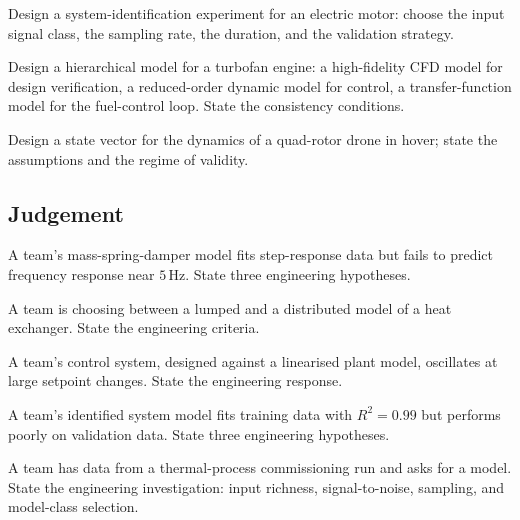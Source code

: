 \begin{exercise}
Design a system-identification experiment for an electric motor: choose the input signal class, the sampling rate, the duration, and the validation strategy.
\end{exercise}

\begin{exercise}
Design a hierarchical model for a turbofan engine: a high-fidelity CFD model for design verification, a reduced-order dynamic model for control, a transfer-function model for the fuel-control loop. State the consistency conditions.
\end{exercise}

\begin{exercise}
Design a state vector for the dynamics of a quad-rotor drone in hover; state the assumptions and the regime of validity.
\end{exercise}

\subsection*{Judgement}

\begin{exercise}
A team's mass-spring-damper model fits step-response data but fails to predict frequency response near $5\,\text{Hz}$. State three engineering hypotheses.
\end{exercise}

\begin{exercise}
A team is choosing between a lumped and a distributed model of a heat exchanger. State the engineering criteria.
\end{exercise}

\begin{exercise}
A team's control system, designed against a linearised plant model, oscillates at large setpoint changes. State the engineering response.
\end{exercise}

\begin{exercise}
A team's identified system model fits training data with $R^2 = 0.99$ but performs poorly on validation data. State three engineering hypotheses.
\end{exercise}

\begin{exercise}
A team has data from a thermal-process commissioning run and asks for a model. State the engineering investigation: input richness, signal-to-noise, sampling, and model-class selection.
\end{exercise}

